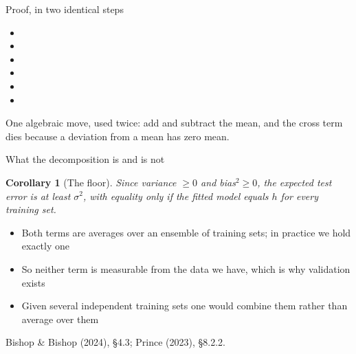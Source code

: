 \documentclass[aspectratio=169, 11pt]{beamer}
\newtheorem{corx}[theorem]{Corollary}
\newcommand{\srcline}[1]{%
  \par\vspace{0.25em}%
  {\scriptsize\color{mcMuted}\hfill #1\par}}
\newcommand{\src}[3]{}      %
\begin{document}
\begin{frame}{Proof, in two identical steps}
  \src{prince2023}{equation}{8.2-8.7}
  \src{prince2023}{section}{8.2.2}
  \vspace{-0.3em}
  {\footnotesize
  \begin{itemize}\itemsep0.30em
    \item {}
    \item {}
    \item {}
    \item {}
    \item {}
    \item {}
  \end{itemize}}
  \vspace{-0.15em}
  \begin{redhighlight}
    One algebraic move, used twice: add and subtract the mean, and the
    cross term dies because a deviation from a mean has zero mean.
  \end{redhighlight}
\end{frame}

\begin{frame}{What the decomposition is and is not}
  \src{bishop2024}{section}{4.3}
  \src{prince2023}{section}{8.2.2}
  \vspace{0.15em}
  \begin{corx}[The floor]\label{th:floor}
    \small
    Since variance $\geq 0$ and bias$^2 \geq 0$, the expected test error
    is at least $\sigma^2$, with equality only if the fitted model
    equals $h$ for every training set.
  \end{corx}
  \vspace{0.25em}
  \begin{itemize}\itemsep0.3em
    \item Both terms are averages over an \alert{ensemble} of training
          sets; in practice we hold exactly one
    \item So neither term is measurable from the data we have, which is
          why validation exists
    \item Given several independent training sets one would combine
          them rather than average over them
  \end{itemize}
  \srcline{Bishop \& Bishop (2024), \S4.3; Prince (2023), \S8.2.2.}
\end{frame}
\end{document}
